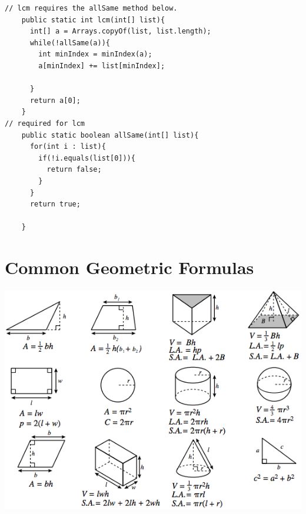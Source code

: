 \documentclass{article}
\begin{document}
\begin{verbatim}
// lcm requires the allSame method below.
    public static int lcm(int[] list){
      int[] a = Arrays.copyOf(list, list.length);
      while(!allSame(a)){
        int minIndex = minIndex(a);
        a[minIndex] += list[minIndex];
        
      }
      return a[0];
    }
// required for lcm
    public static boolean allSame(int[] list){
      for(int i : list){
        if(!i.equals(list[0])){
          return false;
        }
      }
      return true;

    }

\end{verbatim}
\section*{Common Geometric Formulas}
\includegraphics[width=5.5in]{geometric.png}\\




\end{document}
